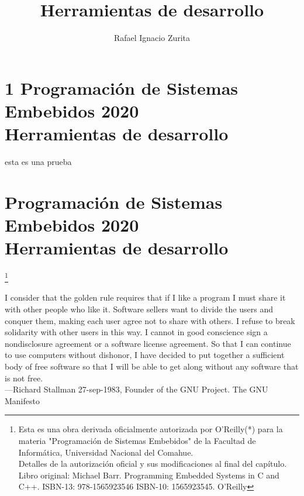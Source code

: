 \documentclass[output=paper, 
colorlinks,
citecolor=brown,
newtxmath
]{langscibook}
\author{Rafael Ignacio Zurita\affiliation{Universidad Nacional del Comahue}}
\title{Herramientas de desarrollo}
\begin{document}

\chapterfont{\Large\color{LightBlue}} 
\chapter*{1 Programación de Sistemas Embebidos 2020\\ Herramientas de desarrollo}
esta es una prueba
{\def\addcontentsline#1#2#3{}\maketitle}

\chapter*{Programación de Sistemas Embebidos 2020\\ Herramientas de desarrollo}

\begingroup
\let\clearpage\relax
\cleardoublepage
\hypersetup{linkcolor=blue}
\tableofcontents*
\endgroup


\footnote{\scriptsize\normalfont Esta es una obra derivada oficialmente autorizada por O'Reilly(*) para la materia "Programación de Sistemas Embebidos" de la Facultad de Informática, Universidad Nacional del Comahue. \\ Detalles de la autorización oficial y sus modificaciones al final del capítulo. \\ Libro original: Michael Barr. Programming Embedded Systems in C and C++. ISBN-13: 978-1565923546
ISBN-10: 1565923545. O'Reilly }

{\def\addcontentsline#1#2#3{}\maketitle}




\hfill\begin{minipage}{0.8\linewidth} \footnotesize
I consider that the golden rule requires that if I like a program I 
must share it with other people who like it. 
Software sellers want to divide the users and conquer them, making 
each user agree not to share with others. I refuse to break solidarity 
with other users in this way. I cannot in good conscience sign a
nondisclosure agreement or a software license agreement. 
So that I can continue to use computers
without dishonor, I have decided to put together a sufficient body of free software so that I will be able
to get along without any software that is not free.\\
—Richard Stallman 27-sep-1983, Founder of the GNU Project. The GNU Manifesto
\end{minipage}
\end{document}
